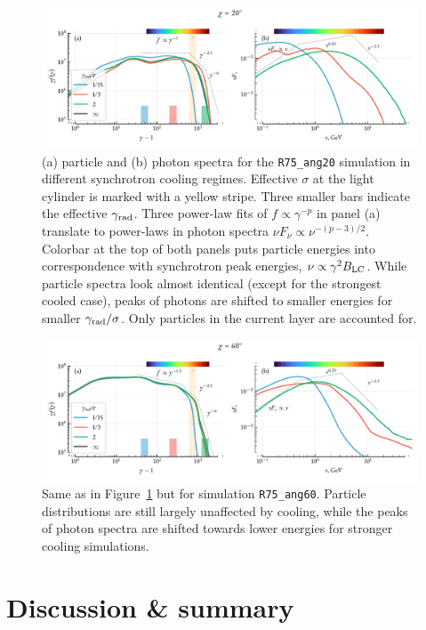 \begin{figure}[htb]
\centering
\includegraphics[width=\columnwidth,trim={10 0 10 5},clip]{figures/ch3-pulsar/fig9_a.pdf}
\caption{(a) particle and (b) photon spectra for the \texttt{R75\_ang20} simulation in different synchrotron cooling regimes. Effective $\sigma$ at the light cylinder is marked with a yellow stripe. Three smaller bars indicate the effective $\gamma_{\rm rad}$. Three power-law fits of $f\propto \gamma^{-p}$ in panel (a) translate to power-laws in photon spectra $\nu F_\nu \propto \nu^{-(p-3)/2}$. Colorbar at the top of both panels puts particle energies into correspondence with synchrotron peak energies, $\nu \propto \gamma^2 B_{\rm LC}$. While particle spectra look almost identical (except for the strongest cooled case), peaks of photons are shifted to smaller energies for smaller $\gamma_{\rm rad}/\sigma$. Only particles in the current layer are accounted for.}
\label{fig:psr-spec20}
\end{figure}

\begin{figure}[htb]
\centering
\includegraphics[width=\columnwidth,trim={10 0 10 5},clip]{figures/ch3-pulsar/fig9_b.pdf}
\caption{Same as in Figure~\ref{fig:psr-spec20} but for simulation \texttt{R75\_ang60}. Particle distributions are still largely unaffected by cooling, while the peaks of photon spectra are shifted towards lower energies for stronger cooling simulations.}
\label{fig:psr-spec60}
\end{figure}

\section{Discussion \& summary}

